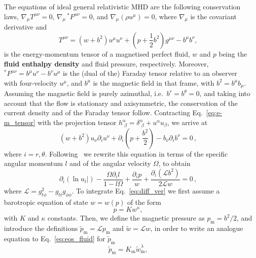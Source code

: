 \documentclass{aa}
\begin{document}
The equations of ideal general relativistic MHD are the following conservation laws, $\nabla_{\mu} T^{\mu\nu} = 0$, $\nabla_{\mu} \,^\ast F^{\mu\nu} = 0$, and 
$\nabla_{\mu} (\rho u^{\mu}) = 0$, 
where $\nabla_{\mu}$ is the covariant derivative and
\begin{equation}\label{eq:e-m_tensor}
T^{\mu\nu} = (w + b^2)u^{\mu}u^{\nu} + \left(p + \frac{1}{2}b^2\right)g^{\mu\nu} - b^{\mu}b^{\nu},
\end{equation}
is the energy-momentum tensor of a magnetised perfect fluid, $w$ and $p$ being the {\bf fluid enthalpy density} and fluid pressure, respectively. 
Moreover, $^\ast F^{\mu\nu} = b^{\mu}u^{\nu} - b^{\nu}u^{\mu}$ is the (dual of the) Faraday tensor relative to an observer with 
four-velocity $u^{\mu}$, and $b^{\mu}$ is the magnetic field in that frame, with
$b^2=b^{\mu}b_{\mu}$. Assuming the magnetic field is purely azimuthal, i.e.~$b^r = b^{\theta} = 0$,
and taking into account that the flow is stationary and axisymmetric, the conservation of the current density and of the Faraday tensor follow. Contracting Eq.~\eqref{eq:e-m_tensor} with the projection tensor $h^{\alpha}_{\,\,\beta} = \delta^{\alpha}_{\,\,\beta} + u^{\alpha}u_{\beta}$, we arrive at
\begin{equation}
(w + b^2)u_{\nu}\partial_i u^{\nu} + \partial_i\left(p + \frac{b^2}{2}\right) - b_{\nu}\partial_i b^{\nu}=0\,,
\end{equation}
where $i = r, \theta$. Following~\cite{Komissarov:2006} we rewrite this equation in terms of the specific angular momentum $l$ and of the angular velocity $\Omega$, to obtain
\begin{equation}\label{eq:diff_ver}
\partial_i(\ln u_t|) - \frac{\Omega \partial_i l}{1-l\Omega} + \frac{\partial_i p}{w} + \frac{\partial_i(\mathcal{L}b^2)}{2\mathcal{L}w} = 0\,,
\end{equation}
where $\mathcal{L} = g_{t\phi}^2 - g_{tt}g_{\phi\phi}$.
To integrate Eq.~\eqref{eq:diff_ver} we first assume a barotropic equation of state $w = w(p)$ of the form
\begin{equation}\label{eq:eos_fluid}
p = K w^{\kappa},
\end{equation}
with $K$ and $\kappa$ constants.
Then, we define the magnetic pressure as $p_{\mathrm{m}} = b^2/2$, and introduce the definitions $\tilde{p}_{\mathrm{m}} = \mathcal{L} p_{\mathrm{m}}$ and $\tilde{w} = \mathcal{L} w$, in order to write an analogue equation to Eq.~\eqref{eq:eos_fluid} for $\tilde{p}_{\mathrm{m}}$~\citep{Komissarov:2006}
\begin{equation}\label{eq:eos_mag_tilde}
\tilde{p}_{\mathrm{m}} = K_{\mathrm{m}} \tilde{w}_{\mathrm{m}}^{\lambda
},
\end{equation}
\end{document}
